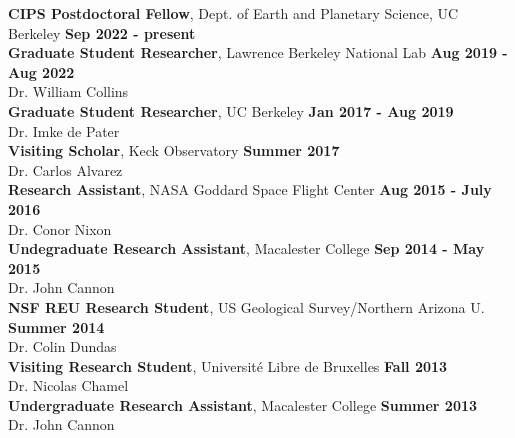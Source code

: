 \documentclass[margin, 10pt]{res} %
\newcommand\tab[1][1cm]{\hspace*{#1}}
\begin{document}
\begin{resume}
{\bf CIPS Postdoctoral Fellow}, Dept. of Earth and Planetary Science, UC Berkeley \hfill {\bf
  Sep 2022 - present} \\
{\bf Graduate Student Researcher}, Lawrence Berkeley National Lab \hfill {\bf
  Aug 2019 - Aug 2022} \\
 \tab {\it Adviser:} Dr. William Collins \\
{\bf Graduate Student Researcher}, UC Berkeley \hfill {\bf
  Jan 2017 - Aug 2019} \\
\tab {\it Adviser:} Dr. Imke de Pater \\
{\bf Visiting Scholar}, Keck Observatory \hfill {\bf
  Summer 2017} \\
\tab {\it Adviser:} Dr. Carlos Alvarez \\
{\bf Research Assistant}, NASA Goddard Space Flight Center \hfill {\bf
  Aug 2015 - July 2016} \\
\tab {\it Adviser:} Dr. Conor Nixon \\
{\bf Undegraduate Research Assistant}, Macalester College \hfill {\bf Sep
2014 - May 2015} \\
\tab {\it Adviser:} Dr. John Cannon \\
{\bf NSF REU Research Student}, US Geological Survey/Northern Arizona U. \hfill {\bf Summer 2014} \\
\tab {\it Adviser:} Dr. Colin Dundas \\
{\bf Visiting Research Student}, Universit\'e Libre de Bruxelles
\hfill {\bf Fall 2013} \\
\tab {\it Adviser:} Dr. Nicolas Chamel \\
{\bf Undergraduate Research Assistant}, Macalester College \hfill
{\bf Summer 2013} \\
\tab {\it Adviser:} Dr. John Cannon \\




\end{resume}
\end{document}
